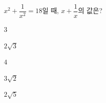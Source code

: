$x^2+\dfrac{1}{x^2}=18$일 때, $x+\dfrac{1}{x}$의 값은? 
\begin{choices32}{\rule[-3ex]{0pt}{8ex}$3$}{\rule[-3ex]{0pt}{8ex}$2\sqrt{3}$}{\rule[-3ex]{0pt}{8ex}$4$}{\rule[-3ex]{0pt}{8ex}$3\sqrt{2}$}{\rule[-3ex]{0pt}{8ex}$2\sqrt{5}$}\end{choices32}
